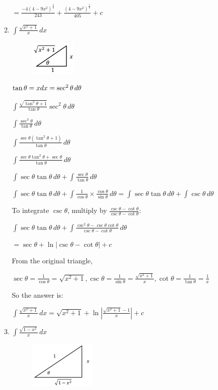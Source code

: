\documentclass[../main.tex]{subfiles}
\begin{document}
\begin{enumerate}
    \(=\frac{-4(4-9x^2)^{\frac{3}{2}}}{243}+\frac{(4-9x^2)^{\frac{5}{2}}}{405}+c\)

    \item 
    \(\int \frac{\sqrt{x^2+1}}{x}\,dx\)
    \begin{figure}[h]
        \includegraphics{images/trigsuba8.png}
    \end{figure}

    \(\tan{\theta}=x\\
    dx=\sec^2{\theta}\,d\theta\)

    \(\int \frac{\sqrt{\tan^2{\theta}+1}}{\tan{\theta}}\sec^2{\theta}\,d\theta\)

    \(\int \frac{\sec^3{\theta}}{\tan{\theta}}\,d\theta\)

    \(\int \frac{\sec{\theta}(\tan^2{\theta}+1)}{\tan{\theta}}\,d\theta\)

    \(\int \frac{\sec{\theta}\tan^2{\theta}+\sec{\theta}}{\tan{\theta}}\,d\theta\)

    \(\int \sec{\theta}\tan{\theta}\,d\theta+\int \frac{\sec{\theta}}{\tan{\theta}}\,d\theta\)

    \(\int \sec{\theta}\tan{\theta}\,d\theta+\int \frac{1}{\cos{\theta}}\times \frac{\cos{\theta}}{\sin{\theta}}\,d\theta=\int \sec{\theta}\tan{\theta}\,d\theta+\int \csc{\theta}\,d\theta\)

    To integrate \(\csc{\theta}\), multiply by \(\frac{\csc{\theta}-\cot{\theta}}{\csc{\theta}-\cot{\theta}}\):

    \(\int \sec{\theta}\tan{\theta}\,d\theta+\int \frac{\csc^2{\theta}-\csc{\theta}\cot{\theta}}{\csc{\theta}-\cot{\theta}}\,d\theta\)

    \(=\sec{\theta}+\ln{|\csc{\theta}-\cot{\theta}|}+c\)

    From the original triangle,

    \(\sec{\theta}=\frac{1}{\cos{\theta}}=\sqrt{x^2+1}, \csc{\theta}=\frac{1}{\sin{\theta}}=\frac{\sqrt{x^2+1}}{x}, \cot{\theta}=\frac{1}{\tan{\theta}}=\frac{1}{x}\)

    So the answer is:

    \(\int \frac{\sqrt{x^2+1}}{x}\,dx=\sqrt{x^2+1}+\ln{|\frac{\sqrt{x^2+1}-1}{x}|}+c\)

    \item 
    \(\int \frac{\sqrt{1-x^2}}{x}\,dx\)
    \begin{figure}[h]
        \includegraphics{images/trigsuba9.png}
    \end{figure}


\end{enumerate}
\end{document}
